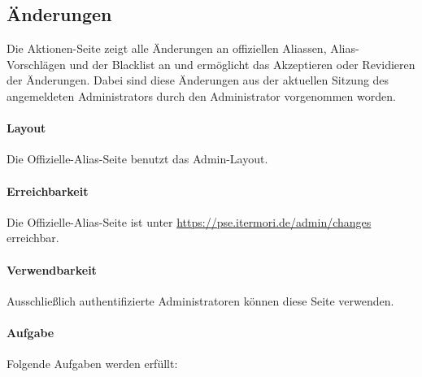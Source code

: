 \subsection{Änderungen}

Die Aktionen-Seite zeigt alle Änderungen an offiziellen Aliassen, Alias-Vorschlägen und der Blacklist an und ermöglicht das Akzeptieren oder Revidieren der Änderungen.
Dabei sind diese Änderungen aus der aktuellen Sitzung des angemeldeten Administrators durch den Administrator vorgenommen worden.

\paragraph*{Layout}
Die Offizielle-Alias-Seite benutzt das Admin-Layout.

\paragraph*{Erreichbarkeit}
Die Offizielle-Alias-Seite ist unter \href{https://pse.itermori.de/admin/changes}{https://pse.itermori.de/admin/changes} erreichbar.

\paragraph*{Verwendbarkeit}
Ausschließlich authentifizierte Administratoren können diese Seite verwenden.

\paragraph*{Aufgabe}
Folgende Aufgaben werden erfüllt:

